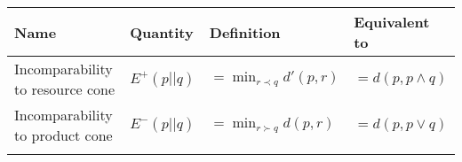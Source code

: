 \begin{table}[h]
    \centering
    \begin{tabular}{|l|lll|}
    \hline
    Name & Quantity                       & Definition            & Equivalent to \\ \hline
    Incomparability to resource cone     & $E^+(p||q)$ & $= \min_{r \prec q} d'(p, r)$ & $= d(p, p \wedge q)$ \\ \hline
    Incomparability to product cone     & $E^-(p||q)$     & $= \min_{r \succ q} d(p, r)$ & $= d(p, p \vee q)$ \\ \hline
         &                                &                       &               \\ \hline
    \end{tabular}
\end{table}